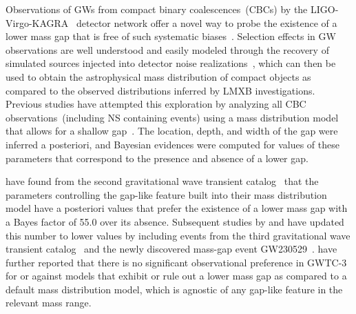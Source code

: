 \documentclass[modern]{aastex631}
\begin{document}
Observations of GWs from compact binary coalescences~(CBCs) by the LIGO-Virgo-KAGRA~\citep[LVK, ][]{LIGOScientific:2014pky, VIRGO:2014yos, KAGRA:2020agh} detector network offer a novel way to probe the existence of a lower mass gap that is free of such systematic biases~\citep{Farah:2021qom,  LIGOScientific:2024elc, KAGRA:2021duu}. Selection effects in GW observations are well understood and easily modeled through the recovery of simulated sources injected into detector noise realizations~\citep{Thrane:2018qnx,Mandel:2018mve,popgw2,popgw3}, which can then be used to obtain the astrophysical mass distribution of compact objects as compared to the observed distributions inferred by LMXB investigations. Previous studies have attempted this exploration by analyzing all CBC observations~(including NS containing events) using a mass distribution model that allows for a shallow gap~\citep{Farah:2021qom,  KAGRA:2021duu, LIGOScientific:2024elc}. The location, depth, and width of the gap were inferred a posteriori, and Bayesian evidences were computed for values of these parameters that correspond to the presence and absence of a lower gap. 

\cite{Farah:2021qom} have found from the second gravitational wave transient catalog~\citep{LIGOScientific:2020ibl} that the parameters controlling the gap-like feature built into their mass distribution model have a posteriori values that prefer the existence of a lower mass gap with a Bayes factor of 55.0 over its absence. Subsequent studies by \cite{KAGRA:2021duu} and \cite{LIGOScientific:2024elc} have updated this number to lower values by including events from the third gravitational wave transient catalog~\citep[GWTC-3,][]{KAGRA:2021vkt} and the newly discovered mass-gap event GW230529~\cite[a compact binary merger whose most massive component lies in the $3-5M_{\odot}$ mass range,][]{LIGOScientific:2024elc}. \cite{KAGRA:2021duu} have further reported that there is no significant observational preference in GWTC-3 for or against models that exhibit or rule out a lower mass gap as compared to a default mass distribution model, which is agnostic of any gap-like feature in the relevant mass range.
\end{document}
